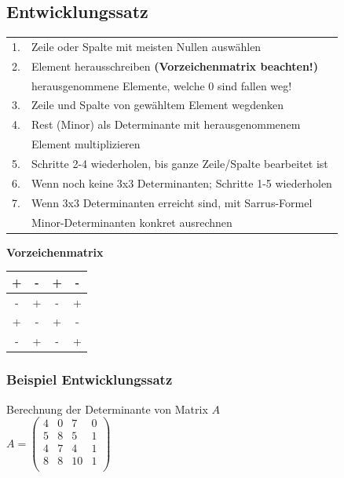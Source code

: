 		    
		    \subsection{Entwicklungssatz}
			
		    \begin{tabular}{ll}
			1. & Zeile oder Spalte mit meisten Nullen auswählen \\
			2. & Element herausschreiben \textbf{(Vorzeichenmatrix beachten!)} \\
			& herausgenommene Elemente, welche 0 sind fallen weg! \\
			3. & Zeile und Spalte von gewähltem Element wegdenken\\
			4. & Rest (Minor) als Determinante mit herausgenommenem \\
			& Element multiplizieren \\
			5. & Schritte 2-4 wiederholen, bis ganze Zeile/Spalte bearbeitet ist \\
			6. & Wenn noch keine 3x3 Determinanten; Schritte 1-5 wiederholen \\
			7. & Wenn 3x3 Determinanten erreicht sind, mit Sarrus-Formel \\
			& Minor-Determinanten konkret ausrechnen	\\	    		
		    \end{tabular}

			
		    \textbf{Vorzeichenmatrix} 
		    
		    \begin{tabular}{| c | c | c | c |}
		    \hline
		    + & - & + & - \\
		    \hline
		    - & + & - & + \\
		    \hline
		    + & - & + & - \\
		    \hline
		    - & + & - & + \\
		    \hline
		    \end{tabular}
					    
		    \subsubsection{Beispiel Entwicklungssatz}
		    Berechnung der Determinante von Matrix $A$ \\
		    $A = \begin{pmatrix}
		    		4 & 0 & 7 & 0 \\
		    		5 & 8 & 5 & 1 \\
		    		4 & 7 & 4 & 1 \\
		    		8 & 8 & 10 & 1 \\
		    		\end{pmatrix}$ \\
		    		
